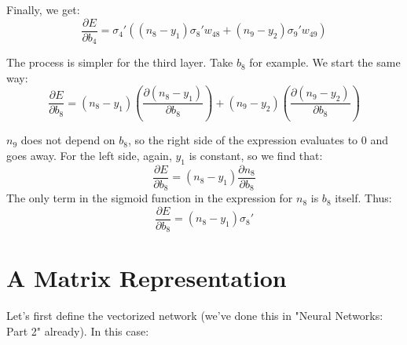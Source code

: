 \documentclass{article}
\begin{document}
Finally, we get:
\[\dfrac{\partial E}{\partial b_4} = \sigma_4'((n_8-y_1)\sigma_8'w_{48} + (n_9-y_2)\sigma_9'w_{49})\]

The process is simpler for the third layer.
Take $b_8$ for example. We start the same way:
\[\dfrac{\partial E}{\partial b_8} = (n_8-y_1)\left(\frac{\partial{(n_8-y_1)}}{\partial b_8}\right)+(n_9-y_2)\left(\frac{\partial{(n_9-y_2)}}{\partial b_8}\right)\]

$n_9$ does not depend on $b_8$, so the right side of the expression evaluates to 0 and goes away. For the left side, again, $y_1$ is constant, so we find that:
\[\dfrac{\partial E}{\partial b_8} = (n_8-y_1)\frac{\partial{n_8}}{\partial b_8}\]
The only term in the sigmoid function in the expression for $n_8$ is $b_8$ itself. Thus:
\[\dfrac{\partial E}{\partial b_8} = (n_8-y_1)\sigma_8'\]

\section{A Matrix Representation}
Let's first define the vectorized network (we've done this in "Neural Networks: Part 2" already). In this case:
\end{document}

